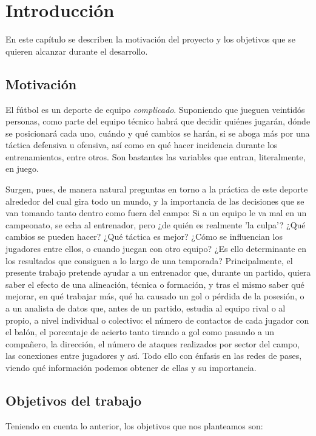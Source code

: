 \chapter{Introducción}
En este capítulo se describen la motivación del proyecto y los objetivos que
se quieren alcanzar durante el desarrollo. 

\section{Motivación}
El fútbol es un deporte de equipo  \textit{complicado}. Suponiendo que 
jueguen veintidós personas, como parte del equipo técnico habrá que 
decidir quiénes jugarán, dónde se posicionará cada uno, cuándo y qué 
cambios se harán, si se aboga más por una táctica defensiva u ofensiva, 
así como en qué hacer incidencia durante los entrenamientos, entre otros. 
Son bastantes las variables que entran, literalmente, en juego. 

Surgen, pues, de manera natural preguntas en torno a la práctica de 
este deporte alrededor del cual gira todo un mundo, y la importancia 
de las decisiones que se van tomando tanto dentro como fuera del 
campo: Si a un equipo le va mal en un campeonato, se echa al entrenador, pero ¿de quién 
es realmente 'la culpa'? ¿Qué cambios se pueden hacer? ¿Qué táctica es mejor? ¿Cómo se influencian los 
jugadores entre ellos, o cuando juegan con otro equipo? ¿Es ello determinante en los 
resultados que consiguen a lo largo de una temporada? 
Principalmente,  el presente trabajo pretende ayudar a un 
entrenador que, durante un partido, quiera saber el efecto de una 
alineación, técnica o formación, y tras el mismo saber 
qué mejorar, en qué trabajar más, qué ha causado un gol o pérdida 
de la posesión, o a un analista de datos que, antes de un partido, 
estudia al equipo rival o al propio, a nivel individual o colectivo: 
el número de contactos de cada jugador con el balón, el porcentaje 
de acierto tanto tirando a gol como pasando a un compañero, la 
dirección, el número de ataques realizados por sector del campo, 
las conexiones entre jugadores y así. Todo ello con énfasis en las 
redes de pases, viendo qué información podemos obtener de ellas y su 
importancia.

\section{Objetivos del trabajo} \label{sect:goals}

Teniendo en cuenta lo anterior, los objetivos que nos planteamos son:

